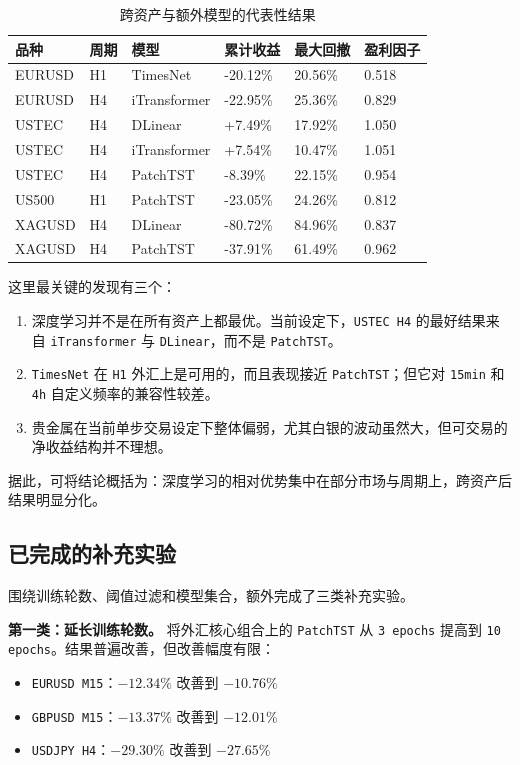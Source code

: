 \documentclass[11pt,a4paper]{ctexart}
\begin{document}
\begin{table}[htbp]
\centering
\caption{跨资产与额外模型的代表性结果}
\label{tab:cross_model}
\small
\begin{tabular}{C{1.8cm} C{1.2cm} C{1.8cm} C{1.6cm} C{1.4cm} C{1.3cm}}
\toprule
品种 & 周期 & 模型 & 累计收益 & 最大回撤 & 盈利因子 \\
\midrule
EURUSD & H1 & TimesNet     & -20.12\% & 20.56\% & 0.518 \\
EURUSD & H4 & iTransformer & -22.95\% & 25.36\% & 0.829 \\
USTEC  & H4 & DLinear      & +7.49\%  & 17.92\% & 1.050 \\
USTEC  & H4 & iTransformer & +7.54\%  & 10.47\% & 1.051 \\
USTEC  & H4 & PatchTST     & -8.39\%  & 22.15\% & 0.954 \\
US500  & H1 & PatchTST     & -23.05\% & 24.26\% & 0.812 \\
XAGUSD & H4 & DLinear      & -80.72\% & 84.96\% & 0.837 \\
XAGUSD & H4 & PatchTST     & -37.91\% & 61.49\% & 0.962 \\
\bottomrule
\end{tabular}
\end{table}

这里最关键的发现有三个：
\begin{enumerate}
  \item 深度学习并不是在所有资产上都最优。当前设定下，\texttt{USTEC H4} 的最好结果来自 \texttt{iTransformer} 与 \texttt{DLinear}，而不是 \texttt{PatchTST}。
  \item \texttt{TimesNet} 在 \texttt{H1} 外汇上是可用的，而且表现接近 \texttt{PatchTST}；但它对 \texttt{15min} 和 \texttt{4h} 自定义频率的兼容性较差。
  \item 贵金属在当前单步交易设定下整体偏弱，尤其白银的波动虽然大，但可交易的净收益结构并不理想。
\end{enumerate}

据此，可将结论概括为：深度学习的相对优势集中在部分市场与周期上，跨资产后结果明显分化。

\subsection{已完成的补充实验}

围绕训练轮数、阈值过滤和模型集合，额外完成了三类补充实验。

\textbf{第一类：延长训练轮数。} 将外汇核心组合上的 \texttt{PatchTST} 从 \texttt{3 epochs} 提高到 \texttt{10 epochs}。结果普遍改善，但改善幅度有限：
\begin{itemize}
  \item \texttt{EURUSD M15}：\(-12.34\%\) 改善到 \(-10.76\%\)
  \item \texttt{GBPUSD M15}：\(-13.37\%\) 改善到 \(-12.01\%\)
  \item \texttt{USDJPY H4}：\(-29.30\%\) 改善到 \(-27.65\%\)
\end{itemize}
\end{document}
